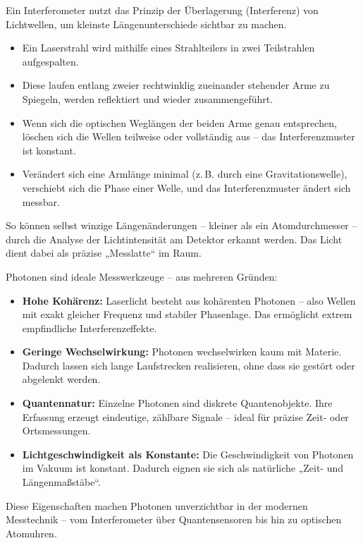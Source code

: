 \vspace{1em}
\begin{tcolorbox}[didaktikbox, title=Wie funktioniert ein Interferometer? \label{box:interferometer}]
	\small
	Ein Interferometer nutzt das Prinzip der Überlagerung (Interferenz) von Lichtwellen, um kleinste Längenunterschiede sichtbar zu machen. 
	
	\begin{itemize}
		\item Ein Laserstrahl wird mithilfe eines Strahlteilers in zwei Teilstrahlen aufgespalten.
		\item Diese laufen entlang zweier rechtwinklig zueinander stehender Arme zu Spiegeln, werden reflektiert und wieder zusammengeführt.
		\item Wenn sich die optischen Weglängen der beiden Arme genau entsprechen, löschen sich die Wellen teilweise oder vollständig aus – das Interferenzmuster ist konstant.
		\item Verändert sich eine Armlänge minimal (z.\,B. durch eine Gravitationswelle), verschiebt sich die Phase einer Welle, und das Interferenzmuster ändert sich messbar.
	\end{itemize}
	
	So können selbst winzige Längenänderungen – kleiner als ein Atomdurchmesser – durch die Analyse der Lichtintensität am Detektor erkannt werden. Das Licht dient dabei als präzise „Messlatte“ im Raum.
\end{tcolorbox}

\vspace{1em}
\begin{tcolorbox}[didaktikbox, title=Warum sind Photonen so genau messbar? \label{box:photonen_genau}]
	\small
	Photonen sind ideale Messwerkzeuge – aus mehreren Gründen:
	
	\begin{itemize}
		\item \textbf{Hohe Kohärenz:} Laserlicht besteht aus kohärenten Photonen – also Wellen mit exakt gleicher Frequenz und stabiler Phasenlage. Das ermöglicht extrem empfindliche Interferenzeffekte.
		\item \textbf{Geringe Wechselwirkung:} Photonen wechselwirken kaum mit Materie. Dadurch lassen sich lange Laufstrecken realisieren, ohne dass sie gestört oder abgelenkt werden.
		\item \textbf{Quantennatur:} Einzelne Photonen sind diskrete Quantenobjekte. Ihre Erfassung erzeugt eindeutige, zählbare Signale – ideal für präzise Zeit- oder Ortsmessungen.
		\item \textbf{Lichtgeschwindigkeit als Konstante:} Die Geschwindigkeit von Photonen im Vakuum ist konstant. Dadurch eignen sie sich als natürliche „Zeit- und Längenmaßstäbe“.
	\end{itemize}
	
	Diese Eigenschaften machen Photonen unverzichtbar in der modernen Messtechnik – vom Interferometer über Quantensensoren bis hin zu optischen Atomuhren.
\end{tcolorbox}

